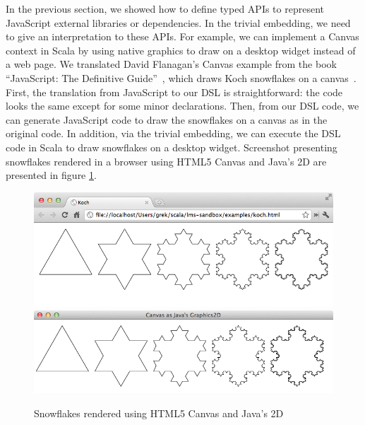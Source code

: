 \documentclass[runningheads,a4paper]{llncs}
\begin{document}
In the previous section, we showed how to define typed APIs to represent JavaScript external libraries or dependencies. In the trivial embedding, we need to give an interpretation to these APIs. For example, we can implement a Canvas context in Scala by using native graphics to draw on a desktop widget instead of a web page. We translated David Flanagan's Canvas example from the book ``JavaScript: The Definitive Guide''~\cite{flanagan}, which draws Koch snowflakes on a canvas~\cite{koch-code}. First, the translation from JavaScript to our DSL is straightforward: the code looks the same except for some minor declarations. Then, from our DSL code, we can generate JavaScript code to draw the snowflakes on a canvas as in the original code. In addition, via the trivial embedding, we can execute the DSL code in Scala to draw snowflakes on a desktop widget. Screenshot presenting snowflakes rendered in a browser using HTML5 Canvas and Java's 2D are presented in figure \ref{fig:snowflakes}.

\begin{figure}
\centering
\includegraphics[scale=0.4]{koch-browser}
\includegraphics[scale=0.4]{koch-java2d}
\caption{Snowflakes rendered using HTML5 Canvas and Java's 2D}
\label{fig:snowflakes}
\end{figure}
\end{document}
